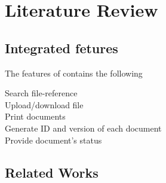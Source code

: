\chapter{Literature Review}

\section{Integrated fetures}
The features of \dms contains the following
\begin{description}
\item[Search file-reference]
\item[Upload/download file]
\item[Print documents]
\item[Generate ID and version of each document]
\item[Provide document's status]
\end{description}

\section{Related Works}
